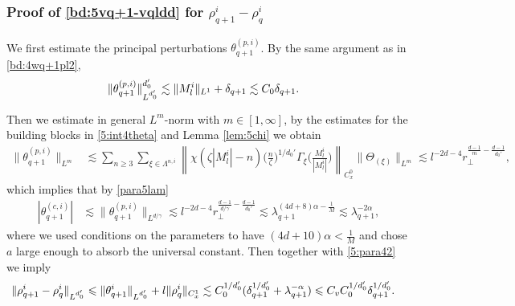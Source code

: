 \documentclass[UTF-8,reqno]{amsart}
\numberwithin{equation}{section}
\theoremstyle{definition}
\def\({{\Big(}}
\def\){{\Big)}}
\newcommand{\norm}[1]{\left\|#1\right\|}
\def\geq{\geqslant}
\def\leq{\leqslant}
\def\({{\Big(}}
\def\){{\Big)}}
\def\geq{\geqslant}
\def\leq{\leqslant}
\begin{document}
\subsubsection{Proof of  \eqref{bd:5vq+1-vqldd} for $  \rho^i_{q+1}-\rho^i_q$}\label{sec:5esttheq+1}
We first estimate the principal perturbations  $\theta^{(p,i)}_{q+1}$. By the same argument as in \eqref{bd:4wq+1pl2}, %
\begin{align}
\|\theta_{q+1}^{(p,i)}\|^{d_0'}_{L^{d_0'}} 
&\lesssim \|M^i_l \|_{L^1}+ \delta_{q+1}\lesssim C_0 \delta_{q+1}
.\notag
\end{align}


Then we estimate in  general $L^m$-norm with $m\in[1,\infty]$, by the estimates for the building blocks in \eqref{5:int4theta}  and Lemma \ref{lem:5chi} we obtain
\begin{align}
\|\theta_{q+1}^{(p,i)} \|_{L^{m}}&\lesssim\sum_{n\geq3}\sum_{\xi\in\Lambda^{n,i}}\norm{\chi(\zeta |M^i_l|-n)\(\frac{n}{\zeta }\)^{1/d_0'}\Gamma_{\xi}\(\frac{M^i_l}{|M^i_l|}\)}_{C_{x}^0}\|\Theta_{ (\xi)} \|_{L^{m}}\lesssim l^{-2d-4}r_\perp^{\frac{d-1}{m}-\frac{d-1}{d_0'}} ,\label{bd:5theq+1plp}
\end{align}
which implies that  by \eqref{para5lam}
\begin{align}
|\theta_{q+1}^{(c,i)} |&\lesssim\|\theta_{q+1}^{(p,i)}\|_{L^{d/\gamma}}\lesssim l^{-2d-4}r_\perp^{\frac{d-1}{d/\gamma}-\frac{d-1}{d_0'}}\lesssim\lambda_{q+1}^{(4d+8)\alpha-\frac1M}\lesssim \lambda_{q+1}^{-2\alpha}, \label{bd:5theq+1clp} 
\end{align}
where we used  conditions on the parameters to have $(4d+10)\alpha<\frac1{M}$ and chose $a$ large enough to absorb the universal constant.
Then together with \eqref{5:para42}    we imply 
\begin{align}
\|  \rho^i_{q+1}-  \rho^i_q\|_{  L^{d_0'}}
&\leq\|\theta^i _{q+1}\|_{  L^{d_0'}}+l\|  \rho^i_{q}\|_{ C_{x}^1} \lesssim C_0^{1/{d_0'}}(\delta_{q+1}^{1/{d_0'}}+\lambda_{q+1}^{-\alpha})\leq C_v C_0^{1/{d_0'}}\delta_{q+1}^{1/{d_0'}}.\notag
\end{align}
\end{document}
